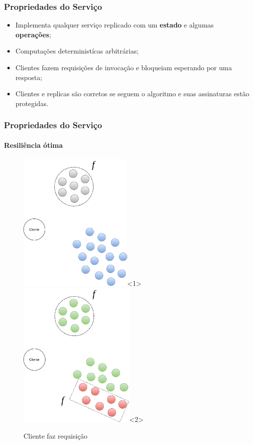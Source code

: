 \documentclass{beamer}
\begin{document}
\begin{frame}
  \frametitle{Propriedades do Serviço}

  \begin{itemize}
    \item
      Implementa qualquer serviço replicado com um \textbf{estado} e algumas \textbf{operações};

    \item
      Computações deterministícas arbitrárias;

    \item
      Clientes fazem requisições de invocação e bloqueiam esperando por uma resposta;

    \item
      Clientes e replicas são corretos se seguem o algoritmo e suas assinaturas estão protegidas.
  \end{itemize}
\end{frame}

\begin{frame}
  \frametitle{Propriedades do Serviço}
  \framesubtitle{Resiliência ótima}

  \begin{figure}
    \includegraphics[width=0.5\textwidth]{images/resiliencia01}<1>
    \includegraphics[width=0.51\textwidth]{images/resiliencia02}<2>
    \caption{Cliente faz requisição}
  \end{figure}

\end{frame}
\end{document}
